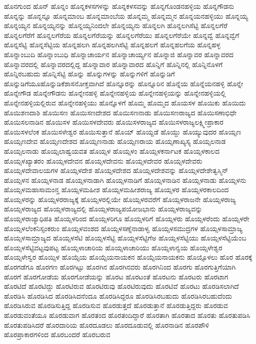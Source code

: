 {ಹೊನಗುಂದ
ಹೊನ್
ಹೊನ್ನಂ
ಹೊನ್ನಕಳಸಗಳನ್ನು
ಹೊನ್ನಕಳಸವನ್ನು
ಹೊನ್ನಗೊಂಡನಹಳ್ಳಿಯ
ಹೊನ್ನಗೌಡನು
ಹೊನ್ನನ್ನು
ಹೊನ್ನನ್ನೂ
ಹೊನ್ನಮಾಂಬ
ಹೊನ್ನಮಾಂಬೆಯ
ಹೊನ್ನಮ್ಮ
ಹೊನ್ನಮ್ಮನ
ಹೊನ್ನಯನಹಳ್ಳಿಯು
ಹೊನ್ನಯ್ಯ
ಹೊನ್ನಯ್ಯನ
ಹೊನ್ನಯ್ಯನನ್ನು
ಹೊನ್ನಯ್ಯನಿಂದಲೇ
ಹೊನ್ನಯ್ಯನು
ಹೊನ್ನಲಗಿ
ಹೊನ್ನಲಗಿಸೆಟ್ಟಿ
ಹೊನ್ನಲಗೆರೆ
ಹೊನ್ನಲಗೆರೆಗೆ
ಹೊನ್ನಲಗೆರೆಯ
ಹೊನ್ನಲಗೆರೆಯನ್ನು
ಹೊನ್ನಲಗೆರೆಯು
ಹೊನ್ನಲಗೆರೆಯೇ
ಹೊನ್ನವ್ವೆ
ಹೊನ್ನವ್ವೆಗೆ
ಹೊನ್ನಸೆಟ್ಟಿ
ಹೊನ್ನಸೆಟ್ಟಿಯ
ಹೊನ್ನಹಲಗಿ
ಹೊನ್ನಹಲಗಿಸೆಟ್ಟಿ
ಹೊನ್ನಹಲಗೆ
ಹೊನ್ನಹಲಗೆಯ
ಹೊನ್ನಹಳ್ಳ
ಹೊನ್ನಾಂಬುದಿ
ಹೊನ್ನಾಂಬುಧಿ
ಹೊನ್ನಾಚಾರ್ಯನ
ಹೊನ್ನಾಚಾರ್ಯ್ಯನ
ಹೊನ್ನಾಜಿ
ಹೊನ್ನಾವರ
ಹೊನ್ನಾವರದ
ಹೊನ್ನಾವರದಲ್ಲಿ
ಹೊನ್ನಾವರದಲ್ಲಿದ್ದ
ಹೊನ್ನಾವಾರ
ಹೊನ್ನಾವಾರದ
ಹೊನ್ನಿಗೆ
ಹೊನ್ನಿನಲ್ಲಿ
ಹೊನ್ನಿನೊಳಗೆ
ಹೊನ್ನಿರಬಹುದು
ಹೊನ್ನಿಸೆಟ್ಟಿ
ಹೊನ್ನು
ಹೊನ್ನುಗಳನ್ನು
ಹೊನ್ನುಗಳಿಗೆ
ಹೊನ್ನುಡಿಗೆ
ಹೊನ್ನುಡಿಗೆಯೂಹೊನ್ನುಡಿಕೆಶಾಸನೋಕ್ತವಾಗಿದೆ
ಹೊನ್ನೂರನ್ನು
ಹೊನ್ನೂರಿನ
ಹೊನ್ನೆಯ
ಹೊನ್ನೆಯನಹಳ್ಳಿ
ಹೊನ್ನೇ
ಹೊನ್ನೇಗೌಡ
ಹೊನ್ನೇಗೌಡನು
ಹೊನ್ನೇನಹಳ್ಳಿ
ಹೊನ್ನೇನಹಳ್ಳಿಯ
ಹೊನ್ನೇನಹಳ್ಳಿಯನ್ನು
ಹೊನ್ನೇನಹಳ್ಳಿಯಲ್ಲಿ
ಹೊನ್ನೇನಹಳ್ಳಿಯಲ್ಲಿರುವ
ಹೊನ್ನೇನಹಳ್ಳಿಯು
ಹೊನ್ನೊಳಗೆ
ಹೊಮ್ಮ
ಹೊಮ್ಮದ
ಹೊಯಸಳ
ಹೊಯಿಕು
ಹೊಯಿದು
ಹೊಯಿಶಣದಾಶಿ
ಹೊಯಿಸಣ
ಹೊಯಿಸಣದೇಶದ
ಹೊಯಿಸಣನಾಡು
ಹೊಯಿಸಣರಾಜ್ಯದ
ಹೊಯಿಸಣಾಭಿಧೇ
ಹೊಯಿಸಲನಾಡಿನ
ಹೊಯಿಸಳ
ಹೊಯಿಸಳದೇವರು
ಹೊಯಿಸಳರಾಜ್ಯದ
ಹೊಯಿಸಳರಾಜ್ಯಲಕ್ಷ್ಮೀಪ್ರಾಕಾರ
ಹೊಯಿಸಳಲೆಂಕ
ಹೊಯಿಸಳೇಶ್ವರ
ಹೊಯಿಸುತ್ತಾನೆ
ಹೊಯ್
ಹೊಯ್ದಡೆ
ಹೊಯ್ದು
ಹೊಯ್ಯುವುದರ
ಹೊಯ್ಸಣ
ಹೊಯ್ಸಣದೇವ
ಹೊಯ್ಸಣದೇಶದ
ಹೊಯ್ಸಣನಾಡು
ಹೊಯ್ಸಣರಾಯ
ಹೊಯ್ಸಣಾಖ್ಯಸ್ಯ
ಹೊಯ್ಸಲನಾಡ
ಹೊಯ್ಸಲನಾಡು
ಹೊಯ್ಸಲಾಹ್ವಯವತ
ಹೊಯ್ಸಳ
ಹೊಯ್ಸಳಂ
ಹೊಯ್ಸಳಕರ್ನಾಟಕ
ಹೊಯ್ಸಳಕಾಲದ
ಹೊಯ್ಸಳಖ್ಯಾತರಂ
ಹೊಯ್ಸಳದೇವನ
ಹೊಯ್ಸಳದೇವನು
ಹೊಯ್ಸಳದೇವರ
ಹೊಯ್ಸಳದೇವರು
ಹೊಯ್ಸಳದೇವಾಲಯಗಳ
ಹೊಯ್ಸಳದೇಶ
ಹೊಯ್ಸಳದೇಶದ
ಹೊಯ್ಸಳದೇಶವನ್ನು
ಹೊಯ್ಸಳದೇಶೇತ್ವಸ್ಮಿನ್
ಹೊಯ್ಸಳನ
ಹೊಯ್ಸಳನಾಡ
ಹೊಯ್ಸಳನಾಡಾಗಿ
ಹೊಯ್ಸಳನಾಡಿಗೆ
ಹೊಯ್ಸಳನಾಡಿನ
ಹೊಯ್ಸಳನಾಡು
ಹೊಯ್ಸಳನು
ಹೊಯ್ಸಳಮಹಾಸಾಮಂನ್ತ
ಹೊಯ್ಸಳಮಹೀಶ
ಹೊಯ್ಸಳಮಹೀಶರಾಜ್ಯ
ಹೊಯ್ಸಳರ
ಹೊಯ್ಸಳರಕಾಲದಿಂದ
ಹೊಯ್ಸಳರನ್ನು
ಹೊಯ್ಸಳರರಾಜ್ಯಕ್ಕೆ
ಹೊಯ್ಸಳರಲ್ಲಿಯೇ
ಹೊಯ್ಸಳರವರೆಗೆ
ಹೊಯ್ಸಳರಾಜನೇ
ಹೊಯ್ಸಳರಾಜ್ಯ
ಹೊಯ್ಸಳರಾಜ್ಯದ
ಹೊಯ್ಸಳರಾಜ್ಯದಲ್ಲಿ
ಹೊಯ್ಸಳರಾಜ್ಯಪಯೋಜಭಾನು
ಹೊಯ್ಸಳರಾಜ್ಯವನ್ನು
ಹೊಯ್ಸಳರಾಜ್ಯಾಧಿಪತಿ
ಹೊಯ್ಸಳರಿಂದ
ಹೊಯ್ಸಳರಿಗೂ
ಹೊಯ್ಸಳರಿಗೆ
ಹೊಯ್ಸಳರು
ಹೊಯ್ಸಳರೆಂದು
ಹೊಯ್ಸಳರೇ
ಹೊಯ್ಸಳಲೆಂಕನಿಸ್ಸಂಕರುಂ
ಹೊಯ್ಸಳವಂಶದ
ಹೊಯ್ಸಳಸಣ್ನೆನಾಡಾಳ್ವ
ಹೊಯ್ಸಳಸಮುದ್ರಗಳ
ಹೊಯ್ಸಳಸಾಮ್ರಾಜ್ಯ
ಹೊಯ್ಸಳಸಾಮ್ರಾಜ್ಯದ
ಹೊಯ್ಸಳಸೆಟಿ
ಹೊಯ್ಸಳಸೆಟ್ಟಿ
ಹೊಯ್ಸಳಸೆಟ್ಟಿಗೆಅ
ಹೊಯ್ಸಳಸೆಟ್ಟಿಯು
ಹೊಯ್ಸಳಸೆಟ್ಟಿಯೆಂಬ
ಹೊಯ್ಸಳಸೆಟ್ಟಿವಟ್ಟವುಪಟ್ಟ
ಹೊಯ್ಸಳಾಚಾರಿಯ
ಹೊಯ್ಸಳಾಚಾರಿಯು
ಹೊಯ್ಸಳಾನ್ವಯ
ಹೊಯ್ಸಳೇಶ್ವರ
ಹೊಯ್ಸಳೇಸ್ವರ
ಹೊಯ್ಸಿಳ
ಹೊಯ್ಸೆಯ
ಹೊಯ್ಸೆಯನಾಯಕನ
ಹೊಯ್ಸೆಯನಾಯಕನು
ಹೊಯ್ಸೊಳಲು
ಹೊರ
ಹೊರಕ್ಕೆ
ಹೊರಗಡೆಗೂ
ಹೊರಗಣ
ಹೊರಗಿಟ್ಟು
ಹೊರಗಿನ
ಹೊರಗಿನವರು
ಹೊರಗಿನಿಂದ
ಹೊರಗು
ಹೊರಗುತ್ತಿಗೆಯಾಗಿ
ಹೊರಗೆ
ಹೊರಗೋಡೆಯ
ಹೊರಗೋಡೆಯನ್ನು
ಹೊರಟ
ಹೊರಟಂತೆ
ಹೊರಟನು
ಹೊರಟರು
ಹೊರಟಾಗ
ಹೊರಟಿದೆ
ಹೊರಟಿದ್ದು
ಹೊರಟಿರುವ
ಹೊರಟಿರುವು
ಹೊರಟಿರುವುದು
ಹೊರಟಿವೆ
ಹೊರಟು
ಹೊರಡಿಸಲಾಗಿದೆ
ಹೊರಡಿಸಿ
ಹೊರಡಿಸಿದ
ಹೊರಡಿಸಿದನೆಂದೂ
ಹೊರಡಿಸಿದ್ದರೂ
ಹೊರಡಿಸಿರಬಹುದು
ಹೊರಡಿಸಿರಬಹುದೆಂದು
ಹೊರಡಿಸಿರುವ
ಹೊರಡಿಸುತ್ತಿದ್ದ
ಹೊರಡಿಸುವ
ಹೊರಡುತ್ತದೆ
ಹೊರಡುತ್ತಾನೆ
ಹೊರಡುತ್ತಿದ್ದರು
ಹೊರಡುವ
ಹೊರಡುವಂತೆಯೂ
ಹೊರಡುವಾಗ
ಹೊರತಂದ
ಹೊರತಂದಿದ್ದಾರೆ
ಹೊರತಾಗಿ
ಹೊರತಾದ
ಹೊರತು
ಹೊರತುಪಡಿಸಿ
ಹೊರತುಪಡಿಸಿದರೆ
ಹೊರದಾರಿಯ
ಹೊರದೂಡಲು
ಹೊರದೂಡುವಲ್ಲಿ
ಹೊರನಾಡಿನ
ಹೊರಪೌಳಿ
ಹೊರಪ್ರಾಕಾರಗಳಿಂದ
ಹೊರಬಂದರೆ
ಹೊರಬರುವ
}
